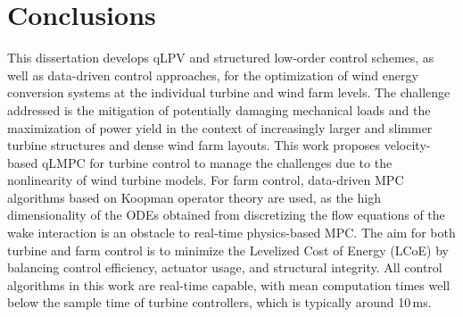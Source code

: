 \section{Conclusions}\label{sec:Conclusions}
This dissertation develops qLPV and structured low-order control schemes, as well as data-driven control approaches, for the optimization of wind energy conversion systems at the individual turbine and wind farm levels. The challenge addressed is the mitigation of potentially damaging mechanical loads and the maximization of power yield in the context of increasingly larger and slimmer turbine structures and dense wind farm layouts. This work proposes velocity-based qLMPC for turbine control to manage the challenges due to the nonlinearity of wind turbine models. For farm control, data-driven MPC algorithms based on Koopman operator theory are used, as the high dimensionality of the ODEs obtained from discretizing the flow equations of the wake interaction is an obstacle to real-time physics-based MPC. The aim for both turbine and farm control is to minimize the Levelized Cost of Energy (LCoE) by balancing control efficiency, actuator usage, and structural integrity. All control algorithms in this work are real-time capable, with mean computation times well below the sample time of turbine controllers, which is typically around 10\,ms.
%
